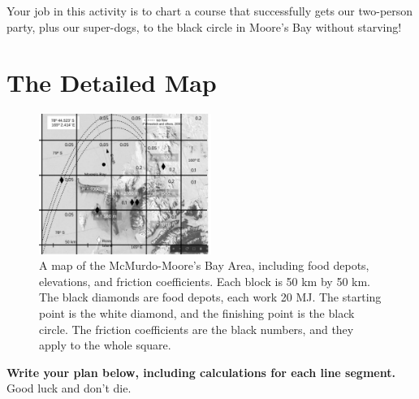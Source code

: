 \documentclass{article}
\begin{document}
Your job in this activity is to chart a course that successfully gets our two-person party, plus our super-dogs, to the black circle in Moore's Bay without starving!

\section{The Detailed Map}

\begin{figure}[ht]
\centering
\includegraphics[width=0.5\textwidth]{NavigationMaze.pdf}
\caption{\label{fig:maze1} A map of the McMurdo-Moore's Bay Area, including food depots, elevations, and friction coefficients.  Each block is 50 km by 50 km.  The black diamonds are food depots, each work 20 MJ.  The starting point is the white diamond, and the finishing point is the black circle.  The friction coefficients are the black numbers, and they apply to the whole square.}
\end{figure}

\textbf{Write your plan below, including calculations for each line segment.}  Good luck and don't die.
\end{document}
